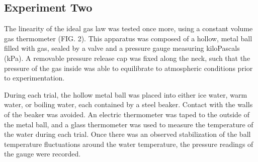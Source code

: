 \documentclass[%
 aip,
 jmp,%
 amsmath,amssymb,
 reprint,%
]{revtex4-1}
\begin{document}
  \subsection{Experiment Two}

  The linearity of the ideal gas law was tested once more, using a constant volume gas thermometer (FIG. 2). This apparatus was composed of a hollow, metal ball filled with gas, sealed by a valve and a pressure gauge measuring kiloPascals (kPa). A removable pressure release cap was fixed along the neck, such that the pressure of the gas inside was able to equilibrate to atmospheric conditions prior to experimentation.

  During each trial, the hollow metal ball was placed into either ice water, warm water, or boiling water, each contained by a steel beaker. Contact with the walls of the beaker was avoided. An electric thermometer was taped to the outside of the metal ball, and a glass thermometer was used to measure the temperature of the water during each trial. Once there was an observed stabilization of the ball temperature fluctuations around the water temperature, the pressure readings of the gauge were recorded.
\end{document}
